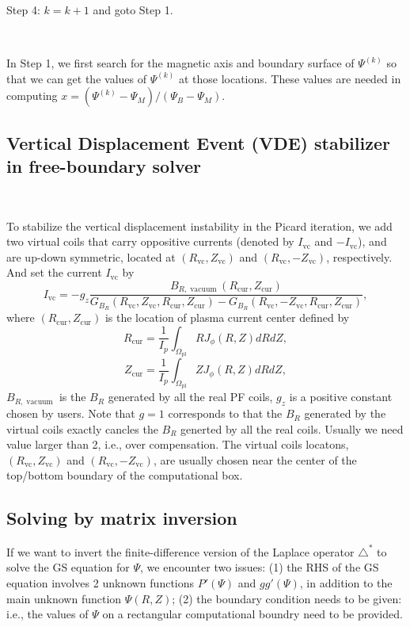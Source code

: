 \documentclass{llncs}
\newcommand{\tmop}[1]{\ensuremath{\operatorname{#1}}}
\begin{document}
Step 4: $k = k + 1$ and goto Step 1.

\

In Step 1, we first search for the magnetic axis and boundary surface of
$\Psi^{(k)}$ so that we can get the values of $\Psi^{(k)}$ at those locations.
These values are needed in computing $x = (\Psi^{(k)} - \Psi_M) / (\Psi_B -
\Psi_M)$.

\subsection{Vertical Displacement Event (VDE) stabilizer in free-boundary
solver{\cite{Jeon2015}}}\label{24-11-8-e1}

\

To stabilize the vertical displacement instability in the Picard iteration,
we add two virtual coils that carry oppositive currents (denoted by
$I_{\tmop{vc}}$ and $- I_{\tmop{vc}}$), and are up-down symmetric, located at
$(R_{\tmop{vc}}, Z_{\tmop{vc}})$ and $(R_{\tmop{vc}}, - Z_{\tmop{vc}})$,
respectively. And set the current $I_{\tmop{vc}}$ by
\[ I_{\tmop{vc}} = - g_z \frac{B_{R, \tmop{vacuum}} (R_{\tmop{cur}},
   Z_{\tmop{cur}})}{G_{B_R} (R_{\tmop{vc}}, Z_{\tmop{vc}}, R_{\tmop{cur}},
   Z_{\tmop{cur}}) - G_{B_R} (R_{\tmop{vc}}, - Z_{\tmop{vc}}, R_{\tmop{cur}},
   Z_{\tmop{cur}})}, \]
where $(R_{\tmop{cur}}, Z_{\tmop{cur}})$ is the location of plasma current
center defined by
\[ R_{\tmop{cur}} = \frac{1}{I_p} \int_{\Omega_{\tmop{pl}}} R J_{\phi} (R, Z)
   d R d Z, \]
\[ Z_{\tmop{cur}} = \frac{1}{I_p} \int_{\Omega_{\tmop{pl}}} Z J_{\phi} (R, Z)
   d R d Z, \]
$B_{R, \tmop{vacuum}}$ is the $B_R$ generated by all the real PF coils, $g_z$
is a positive constant chosen by users. Note that $g = 1$ corresponds to that
the $B_R$ generated by the virtual coils exactly cancles the $B_R$ generted by
all the real coils. Usually we need value larger than 2, i.e., over
compensation. The virtual coils locatons, $(R_{\tmop{vc}}, Z_{\tmop{vc}})$ and
$(R_{\tmop{vc}}, - Z_{\tmop{vc}})$, are usually chosen near the center of the
top/bottom boundary of the computational box.

\subsection{Solving by matrix inversion}\label{24-11-14-e1}

If we want to invert the finite-difference version of the Laplace operator
$\triangle^{\ast}$ to solve the GS equation for $\Psi$, we encounter two
issues: (1) the RHS of the GS equation involves 2 unknown functions $P'
(\Psi)$ and $g g' (\Psi)$, in addition to the main unknown function $\Psi (R,
Z)$; (2) the boundary condition needs to be given: i.e., the values of $\Psi$
on a rectangular computational boundry need to be provided.
\end{document}
